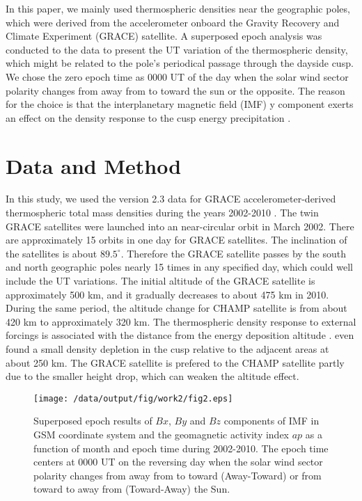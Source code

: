 \documentclass[draft,grl]{/home/gdj/文档/template/agu_template/AGUTeX}
\begin{document}
\begin{article}
    In this paper, we mainly used thermospheric densities near the geographic poles, which were derived from
    the accelerometer onboard the Gravity Recovery and Climate Experiment (GRACE) satellite. 
    A superposed epoch analysis was conducted to the data to present the UT variation of the thermospheric density,
    which might be related to the pole's periodical passage through the dayside cusp. 
    We chose the zero epoch time as 0000 UT of the day when the solar wind sector polarity changes from away from to 
    toward the sun or the opposite.
    The reason for the choice is that the interplanetary magnetic field (IMF) y component exerts an effect on the
    density response to the cusp energy precipitation \citep{Crowley2010, Knipp2011, Li2011}.

\section{Data and Method}
    In this study, we used the version 2.3 data for GRACE accelerometer-derived thermospheric total mass 
    densities during the years 2002-2010 \citep{Sutton2011}. 
    The twin GRACE satellites were launched into an near-circular orbit in March 2002.
    There are approximately 15 orbits in one day for GRACE satellites.
    The inclination of the satellites is about $89.5^\circ$.
    Therefore the GRACE satellite passes by the south and north geographic poles nearly 15 times in any specified day, 
    which could well include the UT variations.
    The initial altitude of the GRACE satellite is approximately 500 km, and it gradually decreases to about 475 km
    in 2010. 
    During the same period, the altitude change for CHAMP satellite is from about 420 km to approximately 320 km.
    The thermospheric density response to external forcings is associated with the distance from the energy deposition 
    altitude \citep{Lei2010a}.
    \citet{Clemmons2008} even found a small density depletion in the cusp relative to the adjacent areas at about 250 km.
    The GRACE satellite is prefered to the CHAMP satellite partly due to the smaller height drop, which can weaken the
    altitude effect.




\end{article}
\begin{figure}
    \centering
    \noindent\texttt{[image: /data/output/fig/work2/fig2.eps]}
    \caption{Superposed epoch results of $Bx$, $By$ and $Bz$ components of IMF in GSM coordinate system and the geomagnetic activity index $ap$ as a function of month and epoch time during 2002-2010. The epoch time centers at 0000 UT on the reversing day when the solar wind sector polarity changes from away from to toward (Away-Toward) or from toward to away from (Toward-Away) the Sun. }
    \label{figure1}
\end{figure}
\end{document}
